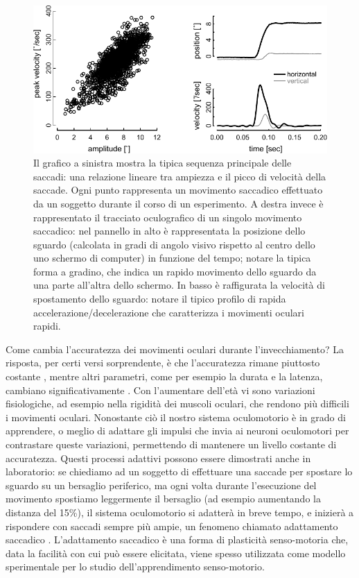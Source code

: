 \documentclass[12pt]{article}
\begin{document}
\begin{figure}
\centering
\includegraphics[width=140mm]{fig2.pdf}
\caption{Il grafico a sinistra mostra la tipica sequenza principale delle saccadi: una relazione lineare tra ampiezza e il picco di velocità della saccade. Ogni punto rappresenta un movimento saccadico effettuato da un soggetto durante il corso di un esperimento. A destra invece è rappresentato il tracciato oculografico di un singolo movimento saccadico: nel pannello in alto è rappresentata la posizione dello sguardo (calcolata in gradi di angolo visivo rispetto al centro dello uno schermo di computer) in funzione del tempo; notare la tipica forma a gradino, che indica un rapido movimento dello sguardo da una parte all'altra dello schermo. In basso è raffigurata la velocità di spostamento dello sguardo: notare il tipico profilo di rapida accelerazione/decelerazione che caratterizza i movimenti oculari rapidi.}
\label{fig2}
\end{figure}

Come cambia l'accuratezza dei movimenti oculari durante l'invecchiamento? La risposta, per certi versi sorprendente, è che l'accuratezza rimane piuttosto costante \cite{Warabi1984}, mentre altri parametri, come per esempio la durata e la latenza, cambiano significativamente \cite{Munoz1998}. Con l'aumentare dell'età vi sono variazioni fisiologiche, ad esempio nella rigidità dei muscoli oculari, che rendono più difficili i movimenti oculari. Nonostante ciò il nostro sistema oculomotorio è in grado di apprendere, o meglio di adattare gli impulsi che invia ai neuroni oculomotori per contrastare queste variazioni, permettendo di mantenere un livello costante di accuratezza. Questi processi adattivi possono essere dimostrati anche in laboratorio: se chiediamo ad un soggetto di effettuare una saccade per spostare lo sguardo su un bersaglio periferico, ma ogni volta durante l'esecuzione del movimento spostiamo leggermente il bersaglio (ad esempio aumentando  la distanza del 15\%), il sistema oculomotorio si adatterà in breve tempo, e inizierà a rispondere con saccadi sempre più ampie, un fenomeno chiamato adattamento saccadico \cite{McLaughlin1967}. L'adattamento saccadico è una forma di plasticità senso-motoria che, data la facilità con cui può essere elicitata, viene spesso utilizzata come modello sperimentale per lo studio dell'apprendimento senso-motorio.
\end{document}
